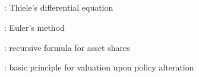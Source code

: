 \subsection*{}
\item {}: Thiele's differential equation
\item {}: Euler's method
\item {}: recursive formula for asset shares
\item {}: basic principle for valuation upon policy
alteration
